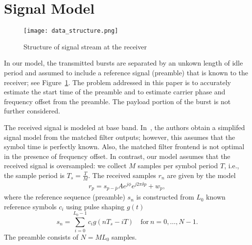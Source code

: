 \section{Signal Model}%
\label{sec:model}

\begin{figure}[t]
  \centerline{\texttt{[image: data\_structure.png]}}
  \caption{Structure of signal stream at the receiver}
  \label{fig:data_structure}
  \end{figure}

In our model, the transmitted bursts are separated by an unkown length of idle period and assumed to
include a reference signal (preamble) that is known to the receiver;
see Figure~\ref{fig:data_structure}. 
The problem addressed in this paper is to accurately estimate the
start time of the preamble and to estimate carrier phase and frequency
offset from the preamble. 
The payload portion of the burst is not further considered. 

The received signal is modeled at base band.
In~\cite{Morelli_Mengali_98}, 
the authors obtain a simplifed signal model from the matched filter
outputs;
however, this assumes that the symbol time is perfectly known.
Also, the matched filter frontend is not optimal in the presence of
frequency offset.
In contrast, our model assumes that the received signal is
oversampled: we collect $M$ samples per symbol period $T$, i.e., the
sample period is $T_s=\frac{T}{M}$. 
The received samples $r_n$ are given by the model
\begin{equation}
    \begin{aligned}
      \label{eq:model}
      r_p = s_{p-\bar{p}}Ae^{j\phi}e^{j2\pi\delta p}+w_{p},
    \end{aligned}
  \end{equation}
where the reference sequence (preamble) $s_n$ is constructed from
$L_0$ known reference symbols $c_i$ using pulse shaping $g(t)$
\begin{equation}
  \label{eq:l_ref_sig_discrete}
  s_n=\sum_{i=0}^{L_0-1} c_i g(nT_s-iT) \quad \text{for}~n=0,\ldots,N-1.
\end{equation}
The preamble consists of $N=M L_0$ samples.  
  
